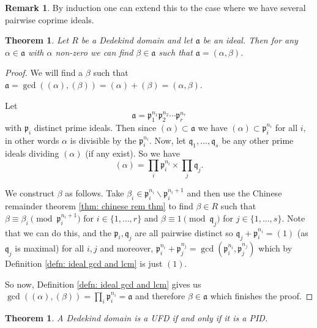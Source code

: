 \documentclass[11pt,a4paper]{report}
\theoremstyle{plain}
\newtheorem{thm}[subsection]{Theorem}
\theoremstyle{definition}
\theoremstyle{definition}
\newtheorem{rmrk}[subsection]{Remark}
\def\gothp{\mathfrak{p}}
\def\gothq{\mathfrak{q}}
\def \a{\alpha}
\def\gotha{\mathfrak{a}}
\begin{document}
\begin{rmrk}
By induction one can extend this to the case where we have several pairwise coprime ideals.
\end{rmrk}

\begin{thm}
Let $R$ be a Dedekind domain and let $\gotha$ be an ideal. Then for any $\a \in \gotha$ with $\a$ non-zero we can find $\beta \in \gotha$ such that $\gotha=(\a,\beta)$.
\end{thm}


\begin{proof}
We will find a $\beta$ such that $\gotha=\gcd((\a),(\beta))=(\a)+(\beta)=(\a,\beta)$.

Let \[\gotha=\gothp_1^{n_1}\gothp_2^{n_2}\cdots\gothp_r^{n_r}\] with $\gothp_i$ distinct prime ideals. Then since $(\a) \subset \gotha$ we have $(\a) \subset \gothp_i^{n_i}$ for all $i$, in other words $\a$ is divisible by the $\gothp_i^{n_i}$. Now, let $\gothq_1,\dots,\gothq_s$ be any other prime ideals dividing $(\a)$ (if any exist). So we have \[(\a)=\prod_i \gothp_i^{n_i} \times \prod_j \gothq_j.\]

We construct $\beta$ as follows. Take $\beta_i \in \gothp_i^{n_i} \backslash \gothp_i^{n_i+1}$ and then use the Chinese remainder theorem \ref{thm: chinese rem thm} to find $\beta \in R$ such that $\beta \equiv \beta_i \pmod {\gothp_i^{n_i+1}}$ for $i \in \{1,\dots,r\}$ and $\beta \equiv 1 \pmod {\gothq_j}$ for $j \in \{1,\dots,s\}$. Note that we can do this, and the $\gothp_i,\gothq_j$ are all pairwise distinct so $\gothq_j+\gothp_i^{n_i}=(1)$ (as $\gothq_j$ is maximal) for all $i,j$ and moreover, $\gothp_i^{n_i}+\gothp_j^{n_j}=\gcd(\gothp_i^{n_i},\gothp_j^{n_j})$ which by Definition \ref{defn: ideal gcd and lcm} is just $(1)$.

So now,  Definition \ref{defn: ideal gcd and lcm} gives us $\gcd((\a),(\beta))=\prod_i \gothp_i^{n_i}=\gotha$ and therefore $\beta \in \gotha$ which finishes the proof.


\end{proof}


\begin{thm}
A Dedekind domain is a UFD if and only if it is a PID.
\end{thm}
\end{document}
